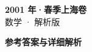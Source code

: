 \documentclass[zihao=-4, a4paper]{ctexart}
\begin{document}
\begin{center}
  {\Large\bfseries 2001 年·春季上海卷}\\[4pt]
  {\large 数学 · 解析版}
\end{center}
\medskip
{}

\clearpage
{}
\begin{center}{\Large\bfseries 参考答案与详细解析}\end{center}
\medskip

\end{document}
